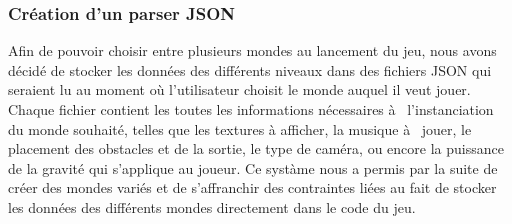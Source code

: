 \subsubsection{Création d'un parser JSON}
Afin de pouvoir choisir entre plusieurs mondes au lancement du jeu, nous avons décidé de stocker les données des différents niveaux dans des fichiers JSON qui seraient lu au moment où l'utilisateur choisit le monde auquel il veut jouer.
\ml
Chaque fichier contient les toutes les informations nécessaires à  l'instanciation du monde souhaité, telles que les textures à afficher, la musique à  jouer, le placement des obstacles et de la sortie, le type de caméra, ou encore la puissance de la gravité qui s'applique au joueur.
\ml
Ce systàme nous a permis par la suite de créer des mondes variés et de s'affranchir des contraintes liées au fait de stocker les données des différents mondes directement dans le code du jeu.

